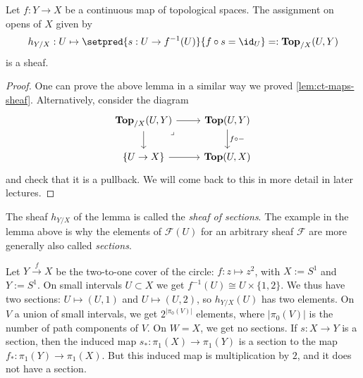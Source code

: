 \begin{lem}[name=sheaf of sections]\label{exmp:sheaf-of-sections}
    Let $f: Y \to X$ be a continuous map of topological spaces. The assignment on opens of $X$ given by 
    \[
        h_{Y/X}: U \mapsto \setpred{s: U \to f^{-1}(U) }{ f \circ s = \id_U} =: \cont[X](U, Y)
    \]
    is a sheaf.
\end{lem}
\begin{proof}
    One can prove the above lemma in a similar way we proved \cref{lem:ct-maps-sheaf}. 
    Alternatively, consider the diagram 
    \[\begin{tikzcd}
	{\cont[X](U,Y)} & {\cont(U,Y)} \\
	{\{U \to X\}} & {\cont(U,X)}
	\arrow["{f \circ -}", from=1-2, to=2-2]
	\arrow[from=1-1, to=2-1]
	\arrow[from=2-1, to=2-2]
	\arrow[from=1-1, to=1-2]
	\arrow["\lrcorner"{anchor=center, pos=0.125}, draw=none, from=1-1, to=2-2]
\end{tikzcd}\]
    and check that it is a pullback. We will come back to this in more detail in later lectures. 
\end{proof}

The sheaf \(h_{Y/X}\) of the lemma is called the \emph{sheaf of sections}.
The example in the lemma above is why the elements of $\mathcal{F}(U)$ for an arbitrary sheaf \(\mathcal F\) are more generally also called \emph{sections}. 

\begin{exmp}
    Let $Y \xrightarrow{f} X$ be the two-to-one cover of the circle: $f: z \mapsto z^2$, with $X := S^1$ and $Y:= S^1$. 
    On small intervals $U \subset X$ we get $f^{-1}(U)  \cong U \times \{1,2\}$. We thus have two sections: $U \mapsto (U, 1)$ and $U \mapsto (U, 2)$, so $h_{Y/X}(U)$ has two elements.
    On $V$ a union of small intervals, we get $2^{|\pi_0(V)|}$ elements, where $|\pi_0(V)|$ is the number of path components of $V$. 
    On $W = X$, we get no sections. If $s: X \to Y$ is a section, then the induced map $s_*: \pi_1(X) \to \pi_1(Y)$ is a section to the map $f_*: \pi_1(Y) \to \pi_1(X)$. But this induced map is multiplication by $2$, and it does not have a section. 
\end{exmp}